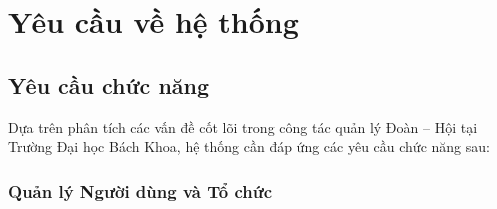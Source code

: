 \section{Yêu cầu về hệ thống}

\subsection{Yêu cầu chức năng}

Dựa trên phân tích các vấn đề cốt lõi trong công tác quản lý Đoàn -- Hội tại Trường Đại học Bách Khoa, hệ thống cần đáp ứng các yêu cầu chức năng sau:

\subsubsection{Quản lý Người dùng và Tổ chức}

